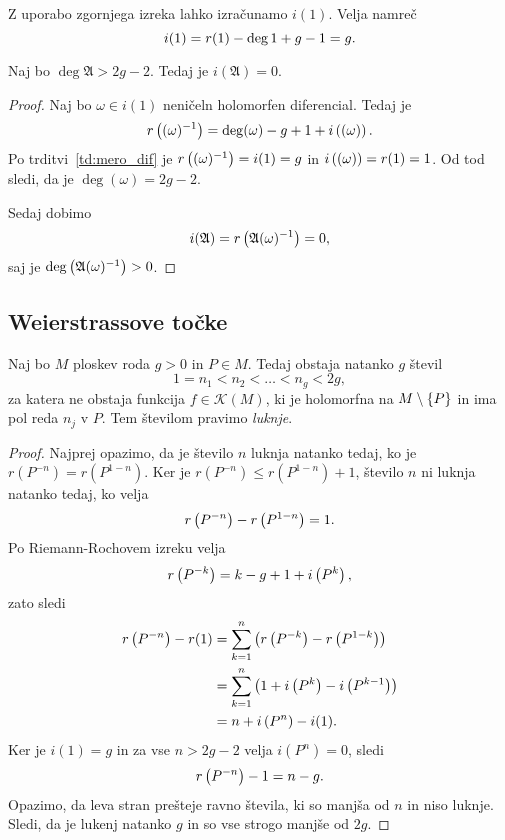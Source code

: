 \begin{zgled}
Z uporabo zgornjega izreka lahko izračunamo $i(1)$. Velja namreč
\[
i(1) = r(1) - \deg 1 + g - 1 = g. \qedhere
\]
\end{zgled}

\begin{trditev}
Naj bo $\deg \mathfrak{A} > 2g - 2$. Tedaj je
$i(\mathfrak{A}) = 0$.
\end{trditev}

\begin{proof}
Naj bo $\omega \in i(1)$ neničeln holomorfen diferencial. Tedaj je
\[
r \left((\omega)^{-1}\right) = \deg (\omega) - g + 1 + i \left((\omega)\right).
\]
Po trditvi~\ref{td:mero_dif} je $r \left((\omega)^{-1}\right) = i(1) = g$
in $i \left((\omega)\right) = r(1) = 1$. Od tod sledi, da je
$\deg (\omega) = 2g - 2$.

Sedaj dobimo
\[
i(\mathfrak{A}) = r \left(\mathfrak{A} (\omega)^{-1}\right) = 0,
\]
saj je $\deg \left(\mathfrak{A} (\omega)^{-1}\right) > 0$.
\end{proof}

\subsection{Weierstrassove točke}

\begin{izrek}[Weierstrass]
Naj bo $M$ ploskev roda $g > 0$ in $P \in M$. Tedaj obstaja
natanko $g$ števil
\[
1 = n_1 < n_2 < \dots < n_g < 2g,
\]
za katera ne obstaja funkcija $f \in \mathscr{K}(M)$, ki je
holomorfna na $M \setminus \left\{P\right\}$ in ima pol reda $n_j$ v $P$.
Tem številom pravimo \emph{luknje}.
\end{izrek}

\begin{proof}
Najprej opazimo, da je število $n$ luknja natanko tedaj, ko je
$r(P^{-n}) = r(P^{1-n})$. Ker je $r(P^{-n}) \leq r(P^{1-n}) + 1$,
število $n$ ni luknja natanko tedaj, ko velja
\[
r \left(P^{-n}\right) - r \left(P^{1-n}\right) = 1.
\]
Po Riemann-Rochovem izreku velja
\[
r \left(P^{-k}\right) = k-g+1 + i \left(P^k\right),
\]
zato sledi
\begin{align*}
r \left(P^{-n}\right) - r(1) &=
\sum_{k=1}^n \left(r \left(P^{-k}\right) - r \left(P^{1-k}\right)\right)
\\
&=
\sum_{k=1}^n \left(1 + i \left(P^k\right) - i \left(P^{k-1}\right)\right)
\\
&=
n + i \left(P^n\right) - i(1).
\end{align*}
Ker je $i(1) = g$ in za vse $n > 2g-2$ velja $i(P^n) = 0$, sledi
\[
r \left(P^{-n}\right) - 1 = n - g.
\]
Opazimo, da leva stran prešteje ravno števila, ki so manjša od $n$
in niso luknje. Sledi, da je lukenj natanko $g$ in so vse strogo
manjše od $2g$.
\end{proof}

